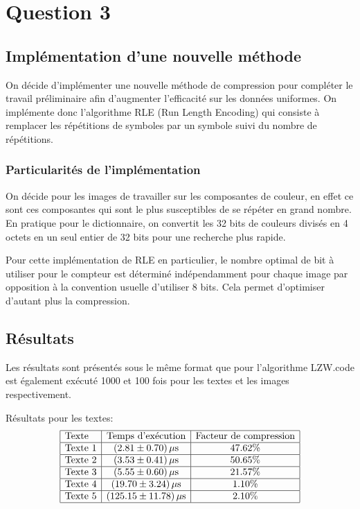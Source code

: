 \documentclass{article}[letterpaper, 11pt]
\begin{document}
\section{Question 3}
\subsection{Implémentation d'une nouvelle méthode}
On décide d'implémenter une nouvelle méthode de compression pour compléter le travail préliminaire afin d'augmenter l'efficacité sur les données uniformes.
On implémente donc l'algorithme RLE (Run Length Encoding) qui consiste à remplacer les répétitions de symboles par un symbole suivi du nombre de répétitions.


\subsubsection{Particularités de l'implémentation}
On décide pour les images de travailler sur les composantes de couleur, en effet ce sont ces composantes qui sont le plus susceptibles de se répéter en grand nombre. En pratique pour le dictionnaire, on convertit les 32 bits de couleurs divisés en 4 octets en un seul entier de 32 bits pour une recherche plus rapide.

Pour cette implémentation de RLE en particulier, le nombre optimal de bit à utiliser pour le compteur est déterminé indépendamment pour chaque image par opposition à la convention usuelle d'utiliser 8 bits. Cela permet d'optimiser d'autant plus la compression.

\subsection{Résultats}
Les résultats sont présentés sous le même format que pour l'algorithme LZW.\@Le code est également exécuté 1000 et 100 fois pour les textes et les images respectivement.

Résultats pour les textes:
\[
\begin{array}{|l|c|c|} \hline %
	\text{Texte} & \text{Temps d'exécution} & \text{Facteur de compression}\\ \hline %
	\text{Texte } 1 & (  2.81 \pm  0.70)\, \mu \text{s} & 47.62\%\\ \hline %
	\text{Texte } 2 & (  3.53 \pm  0.41)\, \mu \text{s} & 50.65\%\\ \hline %
	\text{Texte } 3 & (  5.55 \pm  0.60)\, \mu \text{s} & 21.57\%\\ \hline %
	\text{Texte } 4 & ( 19.70 \pm  3.24)\, \mu \text{s} & 1.10\%\\ \hline %
	\text{Texte } 5 & (125.15 \pm 11.78)\, \mu \text{s} & 2.10\%\\ \hline %
\end{array}
\]
\end{document}
